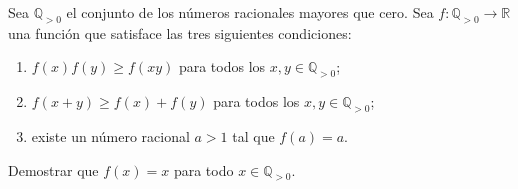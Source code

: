 Sea $\mathbb{Q}_{>0}$ el conjunto de los números racionales mayores que cero. Sea $f : \mathbb{Q}_{\gt 0} \to \mathbb{R}$ una función que satisface las tres siguientes condiciones: 
\begin{enumerate}
\item $f(x)f(y) \geq f(xy)$ para todos los $x,y \in \mathbb{Q}_{>0}$; 
\item $f(x+y)\geq f(x)+f(y)$ para todos los $x,y \in \mathbb{Q}_{>0}$; 
\item existe un número racional $a > 1$ tal que $f(a) = a$. 
\end{enumerate}
Demostrar que $f(x) = x$ para todo $x \in \mathbb{Q}_{>0}$.